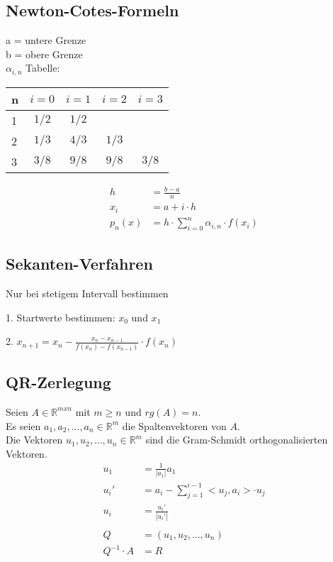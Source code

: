 \documentclass[a4paper, 10pt, landscape]{article}
\begin{document}
\begin{multicols}{5}
\begin{small}
	    \subsection{Newton-Cotes-Formeln}
   			a = untere Grenze\\
			b = obere Grenze\\
			$\alpha_{i,n}$ Tabelle:\\
			\begin{tabular}{l | c c c c }
				\noindent
				n & $i=0$ & $i=1$ & $i=2$ & $i=3$ \\\hline
				1 & $1/2$ & $1/2$ & & \\
				2 & $1/3$ & $4/3$ & $1/3$ & \\
				3 & $3/8$ & $9/8$ & $9/8$ & $3/8$
			\end{tabular}
			\begin{align*}
		        h &= \frac{b-a}{n}\\
		        x_i &= a+i\cdot h\\
		        p_{n}(x) &= h\cdot \sum_{i=0}^{n}\alpha_{i,n}\cdot f(x_{i})
			\end{align*}
		\subsection{Sekanten-Verfahren}
			Nur bei stetigem Intervall bestimmen\\
			\begin{compactitem}
				\item[1.] Startwerte bestimmen: $x_0$ und $x_1$
				\item[2.] $x_{n+1}=x_{n}-\frac{x_{n}-x_{n-1}}{f(x_{n})-f(x_{n-1})}\cdot f(x_{n})$
			\end{compactitem}
		\subsection{QR-Zerlegung}
			Seien $A \in \mathbb{R}^{mxn}$ mit $m \ge n$ und $rg(A) = n$.\\
			Es seien $a_1, a_2, ..., a_n \in \mathbb{R}^m$ die Spaltenvektoren von $A$. \\
			Die Vektoren $u_1, u_2, ..., u_n \in \mathbb{R}^m$ sind die Gram-Schmidt orthogonalisierten Vektoren. 
			\begin{align*}
				u_1 &= \frac{1}{|a_1|} a_1\\
				u_i' &= a_i - \sum_{j = 1}^{i-1} <u_j, a_i> \cdot u_j\\
				u_i &= \frac{u_i'}{|u_i'|}\\\\	 
				Q &= (u_1, u_2, ..., u_n)\\
				Q^{-1}\cdot A &= R 
			\end{align*}

\end{small}
\end{multicols}
\end{document}

